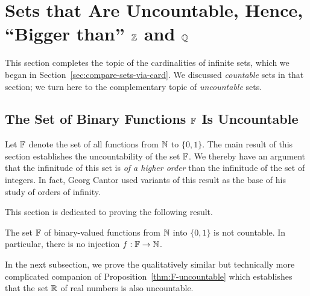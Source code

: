 \section{Sets that Are Uncountable, Hence, ``Bigger than'' $\mathbb{Z}$ and $\mathbb{Q}$}
\label{sec:Q-Z-F-cardinality}
\label{sec:FNS-uncountable}

This section completes the topic of the cardinalities of infinite sets, which we began in Section~\ref{sec:compare-sets-via-card}.  We discussed {\em countable} sets in that section; we turn here to the complementary topic of {\em uncountable} sets.

\subsection{The Set of Binary Functions $\mathbb{F}$ Is Uncountable}
\label{sec:F-uncountable}


Let $\mathbb{F}$ denote the set of all functions from $\mathbb{N}$ to $\{0,1\}$.  The main result of this section establishes the uncountability of the set $\mathbb{F}$.  We thereby have an argument that the infinitude of this set is {\em of a higher order} than the infinitude of the set of integers.  In fact, Georg Cantor used variants of this result as the base of his study of orders of infinity.

\medskip

This section is dedicated to proving the following result.

\begin{prop}
\label{thm:F-uncountable}
The set $\mathbb{F}$ of binary-valued functions from $\mathbb{N}$ into $\{0,1\}$ is not countable.  In particular, there is no injection $f: \mathbb{F} \rightarrow \mathbb{N}$.
\end{prop}

In the next subsection, we prove the qualitatively similar but technically more complicated companion of Proposition~\ref{thm:F-uncountable} which establishes that the set $\mathbb{R}$ of real numbers is also uncountable.

  

